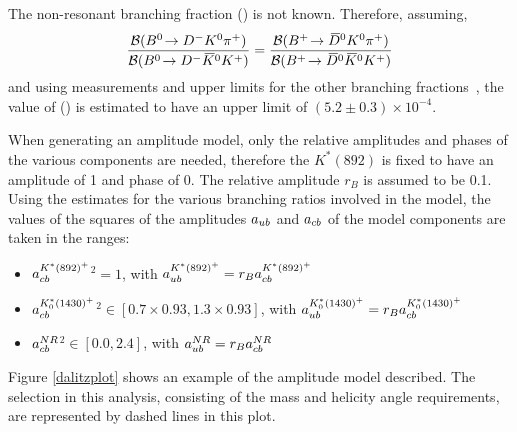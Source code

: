 The non-resonant branching fraction \BR(\decay{\Bp}{\Dzb\KS\pip}) is not known. Therefore, assuming,
\begin{equation*}
\frac{{\mathcal{B}}({{B}^0}\!\rightarrow {\ensuremath{{D}^-}}{\ensuremath{{K}^0}}{\ensuremath{{\pi}^+}})}{{\mathcal{B}}({{B}^0}\!\rightarrow {\ensuremath{{D}^-}}{\ensuremath{{\kern 0.2em\overline{\kern -0.2em K}{}}{}^0}}{\ensuremath{{K}^+}})} = \frac{{\mathcal{B}}({{{B}^+}}\!\rightarrow {\ensuremath{{\kern 0.2em\overline{\kern -0.2em D}{}}{}^0}}{\ensuremath{{K}^0}}{\ensuremath{{\pi}^+}})}{{\mathcal{B}}({{{B}^+}}\!\rightarrow {\ensuremath{{\kern 0.2em\overline{\kern -0.2em D}{}}{}^0}}{\ensuremath{{\kern 0.2em\overline{\kern -0.2em K}{}}{}^0}}{\ensuremath{{K}^+}})}
\end{equation*}
and using measurements and upper limits for the other branching fractions~\cite{PDG2014}, the value of \BR(\decay{\Bp}{\Dzb\KS\pip}) is estimated to have an upper limit of $(5.2 \pm 0.3) \times 10^{-4}$.

When generating an amplitude model, only the relative amplitudes and phases of the various components are needed, therefore the $K^*(892)$ is fixed to have an amplitude of 1 and phase of 0. The relative amplitude $r_B$ is assumed to be 0.1. Using the estimates for the various branching ratios involved in the model, the values of the squares of the amplitudes $a_{{u}{b}}$ and $a_{{c}{b}}$ of the model components are taken in the ranges:

\begin{itemize}
\item \textbar $a_{{c}{b}}^{K^*(892)^+}$\textbar$^2 = 1$, \hspace{12pt} with $a_{{u}{b}}^{K^*(892)^+} = r_B a_{{c}{b}}^{K^*(892)^+}$
\item \textbar $a_{{c}{b}}^{K^*_0(1430)^+}$\textbar$^2 \in [0.7 \times 0.93,1.3 \times 0.93]$, \hspace{14pt} with $a_{{u}{b}}^{K^*_0(1430)^+} = r_B a_{{c}{b}}^{K^*_0(1430)^+}$
\item \textbar $a_{{c}{b}}^{NR}$\textbar$^2 \in [0.0,2.4]$, \hspace{12pt} with $a_{{u}{b}}^{NR} = r_B a_{{c}{b}}^{NR}$
\end{itemize}

Figure \ref{dalitzplot} shows an example of the amplitude model described. The \Kstar selection in this analysis, consisting of the \Kstar mass and \KS helicity angle requirements, are represented by dashed lines in this plot.

